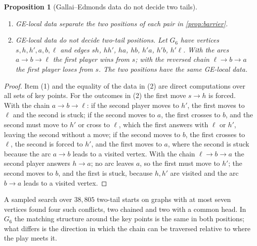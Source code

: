 \documentclass[11pt]{amsart}
\theoremstyle{plain}
\newtheorem{proposition}[theorem]{Proposition}
\theoremstyle{definition}
\theoremstyle{remark}
\numberwithin{equation}{section}
\begin{document}
\begin{proposition}[Gallai--Edmonds data do not decide two tails]\label{prop:ge-barrier}
\begin{enumerate}[label=\textup{(\arabic*)}]
\item GE-local data separate the two positions of each pair in \cref{prop:barrier}.
\item GE-local data do not decide two-tail positions. Let $G_6$ have vertices $s,h,h',a,b,\ell$ and edges $sh$, $hh'$, $ha$, $hb$, $h'a$, $h'b$, $h'\ell$. With the arcs $a\to b\to\ell$ the first player wins from $s$; with the reversed chain $\ell\to b\to a$ the first player loses from $s$. The two positions have the same GE-local data.
\end{enumerate}
\end{proposition}
\begin{proof}
Item (1) and the equality of the data in (2) are direct computations over all sets of key points. For the outcomes in (2) the first move $s\to h$ is forced. With the chain $a\to b\to\ell$: if the second player moves to $h'$, the first moves to $\ell$ and the second is stuck; if the second moves to $a$, the first crosses to $b$, and the second must move to $h'$ or cross to $\ell$, which the first answers with $\ell$ or $h'$, leaving the second without a move; if the second moves to $b$, the first crosses to $\ell$, the second is forced to $h'$, and the first moves to $a$, where the second is stuck because the arc $a\to b$ leads to a visited vertex. With the chain $\ell\to b\to a$ the second player answers $h\to a$; no arc leaves $a$, so the first must move to $h'$; the second moves to $b$, and the first is stuck, because $h,h'$ are visited and the arc $b\to a$ leads to a visited vertex.
\end{proof}

A sampled search over $38{,}805$ two-tail starts on graphs with at most seven vertices found four such conflicts, two chained and two with a common head. In $G_6$ the matching structure around the key points is the same in both positions; what differs is the direction in which the chain can be traversed relative to where the play meets it.
\end{document}
